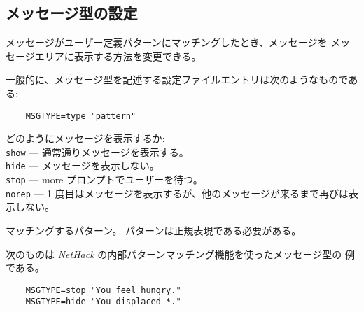 \subsection*{メッセージ型の設定}

メッセージがユーザー定義パターンにマッチングしたとき、メッセージを
メッセージエリアに表示する方法を変更できる。

一般的に、メッセージ型を記述する設定ファイルエントリは次のようなものである:
\begin{verbatim}
    MSGTYPE=type "pattern"
\end{verbatim}
\blist{}
\item[\ib{type}]
どのようにメッセージを表示するか:
\\
{\tt show}  --- 通常通りメッセージを表示する。\\
{\tt hide}  --- メッセージを表示しない。\\
{\tt stop}  --- more プロンプトでユーザーを待つ。\\
{\tt norep} --- 1 度目はメッセージを表示するが、他のメッセージが来るまで再びは表示しない。
\item[\ib{pattern}]
マッチングするパターン。
パターンは正規表現である必要がある。
\elist

次のものは {\it NetHack\/} の内部パターンマッチング機能を使ったメッセージ型の
例である。

\begin{verbatim}
    MSGTYPE=stop "You feel hungry."
    MSGTYPE=hide "You displaced *."
\end{verbatim}


